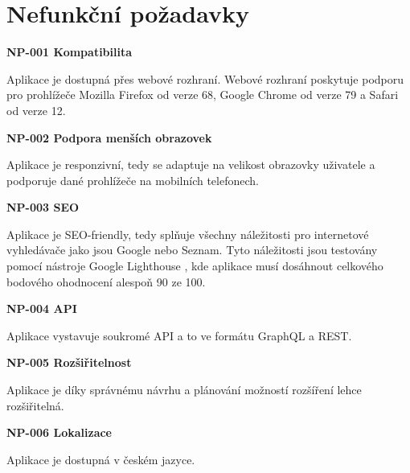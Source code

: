 \section{Nefunkční požadavky}
\label{sc:non_func_req}
\noindent \textbf{NP-001 Kompatibilita}

Aplikace je dostupná přes webové rozhraní. Webové rozhraní poskytuje podporu pro prohlížeče Mozilla Firefox od verze 68, Google Chrome od verze 79 a Safari od verze 12.

\noindent \textbf{NP-002 Podpora menších obrazovek}

Aplikace je responzivní, tedy se adaptuje na velikost obrazovky uživatele a podporuje dané prohlížeče na mobilních telefonech.

\noindent \textbf{NP-003 SEO}

Aplikace je SEO-friendly, tedy splňuje všechny náležitosti pro internetové vyhledávače jako jsou Google nebo Seznam. Tyto náležitosti jsou testovány pomocí nástroje Google Lighthouse \cite{googlellc_2019_lighthouse}, kde aplikace musí dosáhnout celkového bodového ohodnocení alespoň 90 ze 100.

\noindent \textbf{NP-004 API}

Aplikace vystavuje soukromé API a to ve formátu GraphQL a REST.

\noindent \textbf{NP-005 Rozšiřitelnost}

Aplikace je díky správnému návrhu a plánování možností rozšíření lehce rozšiřitelná.

\noindent \textbf{NP-006 Lokalizace}

Aplikace je dostupná v českém jazyce.